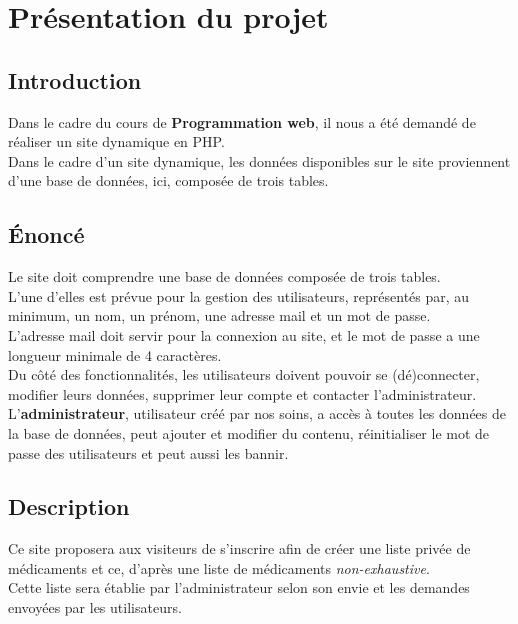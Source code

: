 \section{Présentation du projet}
\label{sec:presentation}


\subsection{Introduction}
\label{sec:intro}

Dans le cadre du cours de \textbf{Programmation web}, il nous a été demandé de réaliser un site dynamique en PHP.\\
Dans le cadre d'un site dynamique, les données disponibles sur le site proviennent d'une base de données, ici, composée de trois tables.


\subsection{Énoncé}
\label{sec:enonce}

Le site doit comprendre une base de données composée de trois tables.\\

L'une d'elles est prévue pour la gestion des utilisateurs, représentés par, au minimum, un nom, un prénom, une adresse mail et un mot de passe.\\
L'adresse mail doit servir pour la connexion au site, et le mot de passe a une longueur minimale de 4 caractères.\\

Du côté des fonctionnalités, les utilisateurs doivent pouvoir se (dé)connecter, modifier leurs données, supprimer leur compte et contacter l'administrateur.\\
L'\textbf{administrateur}, utilisateur créé par nos soins, a accès à toutes les données de la base de données, peut ajouter et modifier du contenu, réinitialiser le mot de passe des utilisateurs et peut aussi les bannir.


\subsection{Description}
\label{sec:description}

Ce site proposera aux visiteurs de s'inscrire afin de créer une liste privée de médicaments et ce, d’après une liste de médicaments \textit{non-exhaustive}.\\
Cette liste sera établie par l'administrateur selon son envie et les demandes envoyées par les utilisateurs.\\

